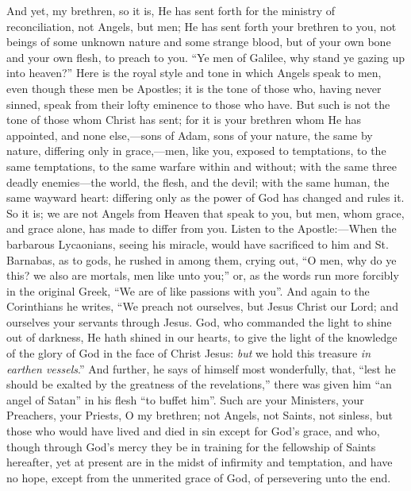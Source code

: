 And yet, my brethren, so it is, He has sent forth for the ministry
of reconciliation, not Angels, but men; He has sent forth your
brethren to you, not beings of some unknown nature and some strange
blood, but of your own bone and your own flesh, to preach to you.
``Ye men of Galilee, why stand ye gazing up into heaven?''
Here is the royal style and tone in which Angels speak to men, even
though these men be Apostles; it is the tone of those who, having
never sinned, speak from their lofty eminence to those who have. But
such is not the tone of those whom Christ has sent; for it is your
brethren whom He has appointed, and none else,—sons of Adam, sons of
your nature, the same by nature, differing only in grace,—men, like
you, exposed to temptations, to the same temptations, to the same
warfare within and without; with the same three deadly enemies—the
world, the flesh, and the devil; with the same human, the same wayward
heart: differing only as the power of God has changed and rules it. So
it is; we are not Angels from Heaven that speak to you, but men, whom
grace, and grace alone, has made to differ from you. Listen to the
Apostle:—When the barbarous Lycaonians, seeing his miracle, would
have sacrificed to him and St. Barnabas, as to gods, he rushed in
among them, crying out, ``O men, why do ye this? we also are
mortals, men like unto you;'' or, as the words run more forcibly
in the original Greek, ``We are of like passions with you''.
And again to the Corinthians he writes, ``We preach not ourselves,
but Jesus Christ our Lord; and ourselves your servants through Jesus.
God, who commanded the light to shine out of darkness, He hath shined
in our hearts, to give the light of the knowledge of the glory of God
in the face of Christ Jesus: \emph{but} we hold this treasure \emph{in
earthen vessels}.'' And further, he says of himself most
wonderfully, that, ``lest he should be exalted by the greatness of
the revelations,'' there was given him ``an angel of
Satan'' in his flesh ``to buffet him''. Such are your
Ministers, your Preachers, your Priests, O my brethren; not Angels,
not Saints, not sinless, but those who would have lived and died in
sin except for God's grace, and who, though through God's mercy they
be in training for the fellowship of Saints hereafter, yet at present
are in the midst of infirmity and temptation, and have no hope, except
from the unmerited grace of God, of persevering unto the end.

